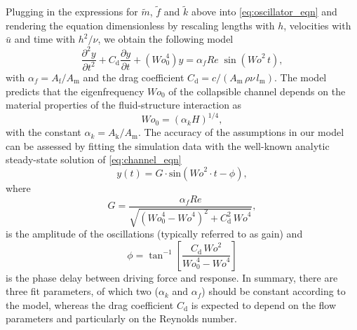 \documentclass[aps,prl,reprint,superscriptaddress,floatfix]{revtex4-1}
\newcommand{\Rey}{\mathit{Re}}
\newcommand{\Wo}{\mathit{Wo}}
\begin{document}
Plugging in the expressions for $\tilde m$,  $\tilde f$ and $\tilde k$ above into \eqref{eq:oscillator_eqn} and rendering the equation dimensionless by rescaling lengths with $h$, velocities with $\bar{u}$ and time with $h^2/\nu$, we obtain the following model 
\begin{equation}
\frac{\partial^2 y}{\partial t^2}+C_\text{d}\frac{\partial y}{\partial t}+\left(\Wo^4_0\right)y={\alpha_f}{\Rey}\;\sin\left(\Wo^2 \, t\right),
\label{eq:channel_eqn}
\end{equation}
with $\alpha_f=A_\text{f}/A_\text{m}$ and the drag coefficient $C_\text{d}=c/(A_\text{m}\,\rho\nu\,l_\text{m})$. The model predicts that the eigenfrequency $\Wo_0$ of the collapsible channel depends on the material properties of the fluid-structure interaction as
\begin{equation}\label{eq:model_St0}
\Wo_0=({\alpha_k}H)^{1/4},
\end{equation}
with the constant $\alpha_k=A_\text{k}/A_\text{m}$. The accuracy of the assumptions in our model can be assessed by fitting the simulation data with the well-known analytic steady-state solution of \eqref{eq:channel_eqn} 
\begin{equation}
y(t)=G\cdot\text{sin}\left(\Wo^2\cdot t-\phi\right),
\label{eq:channel_solution}
\end{equation}
where 
\begin{equation}
G = \dfrac{{\alpha_f}{\Rey}}{\sqrt{\left(\Wo^4_0-\Wo^4\right)^2+C_\text{d}^2\,\Wo^4}},
\label{eq:channel_gain}
\end{equation}
is the amplitude of the oscillations (typically referred to as gain) and 
\begin{equation}
\phi=\tan^{-1}\left[\dfrac{C_\text{d}\, \Wo^2}{\Wo_0^4-\Wo^4}\right]
\label{eq:channel_phase}
\end{equation}
is the phase delay between driving force and response. In summary, there are three fit parameters, of which two ($\alpha_k$ and $\alpha_f$) should be constant according to the model, whereas the drag coefficient $C_\text{d}$ is expected to depend on the flow parameters and particularly on the Reynolds number. 
\end{document}
